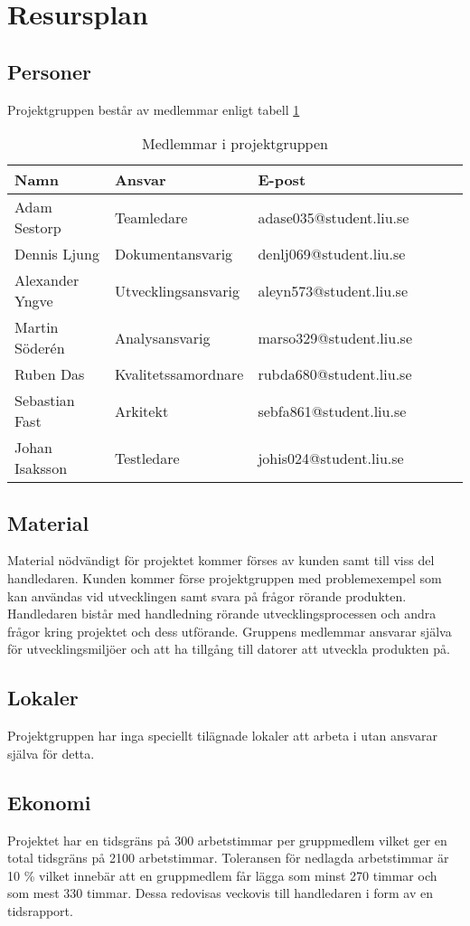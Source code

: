 \section{Resursplan}

\subsection{Personer}
Projektgruppen består av medlemmar enligt tabell \ref{projektplan:resursplan-personer}
\begin{table}[h]
	\centering
		\begin{tabularx}{\textwidth}{| l | l | X | l | l | l |}
			\hline
			\textbf{Namn} & \textbf{Ansvar} & \textbf{E-post} \\
			\hline
			{Adam Sestorp} & {Teamledare} & {adase035@student.liu.se} \\\hline
			{Dennis Ljung} & {Dokumentansvarig} & {denlj069@student.liu.se} \\\hline
			{Alexander Yngve} & {Utvecklingsansvarig} & {aleyn573@student.liu.se} \\\hline
			{Martin Söderén} & {Analysansvarig} & {marso329@student.liu.se} \\\hline
			{Ruben Das} & {Kvalitetssamordnare} & {rubda680@student.liu.se} \\\hline
			{Sebastian Fast} & {Arkitekt} & {sebfa861@student.liu.se} \\\hline
			{Johan Isaksson} & {Testledare} & {johis024@student.liu.se} \\\hline

		\end{tabularx}
	\caption{Medlemmar i projektgruppen} \label{projektplan:resursplan-personer}
\end{table}

\subsection{Material}
Material nödvändigt för projektet kommer förses av kunden samt till viss del handledaren. Kunden kommer förse projektgruppen med problemexempel som kan användas vid utvecklingen samt svara på frågor rörande produkten. Handledaren bistår med handledning rörande utvecklingsprocessen och andra frågor kring projektet och dess utförande.
Gruppens medlemmar ansvarar själva för utvecklingsmiljöer och att ha tillgång till datorer att utveckla produkten på.

\subsection{Lokaler}
Projektgruppen har inga speciellt tilägnade lokaler att arbeta i utan ansvarar själva för detta.

\subsection{Ekonomi}
Projektet har en tidsgräns på 300 arbetstimmar per gruppmedlem vilket ger en total tidsgräns på 2100 arbetstimmar. Toleransen för nedlagda arbetstimmar är 10 \% vilket innebär att en gruppmedlem får lägga som minst 270 timmar och som mest 330 timmar. Dessa redovisas veckovis till handledaren i form av en tidsrapport.